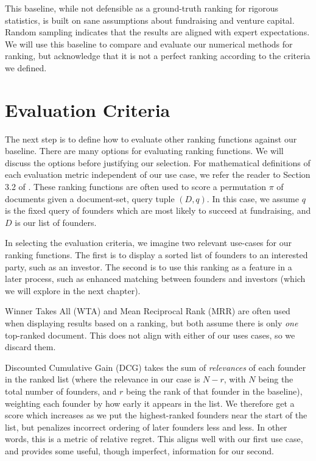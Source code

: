 This baseline, while not defensible as a ground-truth ranking for rigorous statistics, is built on sane assumptions about fundraising and venture capital. Random sampling indicates that the results are aligned with expert expectations. We will use this baseline to compare and evaluate our numerical methods for ranking, but acknowledge that it is not a perfect ranking according to the criteria we defined.

\section{Evaluation Criteria}

The next step is to define how to evaluate other ranking functions against our baseline. There are many options for evaluating ranking functions. We will discuss the options before justifying our selection. For mathematical definitions of each evaluation metric independent of our use case, we refer the reader to Section 3.2 of \cite{DBLP:journals/corr/abs-0704-3359}. These ranking functions are often used to score a permutation $\pi$ of documents given a document-set, query tuple $(D, q)$. In this case, we assume $q$ is the fixed query of founders which are most likely to succeed at fundraising, and $D$ is our list of founders.

In selecting the evaluation criteria, we imagine two relevant use-cases for our ranking functions. The first is to display a sorted list of founders to an interested party, such as an investor. The second is to use this ranking as a feature in a later process, such as enhanced matching between founders and investors (which we will explore in the next chapter).

Winner Takes All (WTA) and Mean Reciprocal Rank (MRR) are often used when displaying results based on a ranking, but both assume there is only \textit{one} top-ranked document. This does not align with either of our uses cases, so we discard them.

Discounted Cumulative Gain (DCG) takes the sum of \textit{relevances} of each founder in the ranked list (where the relevance in our case is $N - r$, with $N$ being the total number of founders, and $r$ being the rank of that founder in the baseline), weighting each founder by how early it appears in the list. We therefore get a score which increases as we put the highest-ranked founders near the start of the list, but penalizes incorrect ordering of later founders less and less. In other words, this is a metric of relative regret. This aligns well with our first use case, and provides some useful, though imperfect, information for our second.

